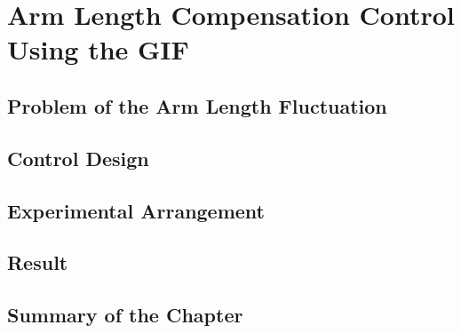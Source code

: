 \chapter{Arm Length Compensation Control Using the GIF}




\section{Problem of the Arm Length Fluctuation}
\subsection{}
\subsection{}
\subsection{}




\section{Control Design}
\subsection{}
\subsection{}
\subsection{}




\section{Experimental Arrangement}
\subsection{}
\subsection{}
\subsection{}




\section{Result}
\subsection{}
\subsection{}
\subsection{}




\section{Summary of the Chapter}
